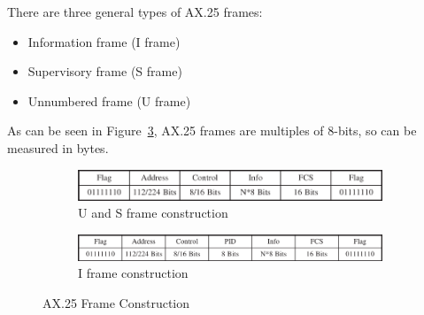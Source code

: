\documentclass[letter,12pt]{article}
\begin{document}
		There are three general types of AX.25 frames: 
		\begin{itemize}
			\item Information frame (I frame)
			\item Supervisory frame (S frame)
			\item Unnumbered frame (U frame)
		\end{itemize}
		As can be seen in Figure~\ref{fig:AX25_Frame}, AX.25 frames are multiples of 8-bits, so can be measured in bytes. 
		
		\begin{figure}
			\centering
			\begin{subfigure}[b]{\textwidth}
				\includegraphics[width=\textwidth]{./PNGs/AX25_US_Frame.png}
				\caption{U and S frame construction}
				\label{fig:AX25_US_Frame}
			\end{subfigure}
			
			\vspace{12pt}
			
			\begin{subfigure}[b]{\textwidth}
				\includegraphics[width=\textwidth]{./PNGs/AX25_Information_Frame.png}
				\caption{I frame construction}
				\label{fig:AX25_I_Frame}
			\end{subfigure}
			
			\caption{AX.25 Frame Construction \cite{Beech_98}}
			\label{fig:AX25_Frame}
		\end{figure}
	
\end{document}

